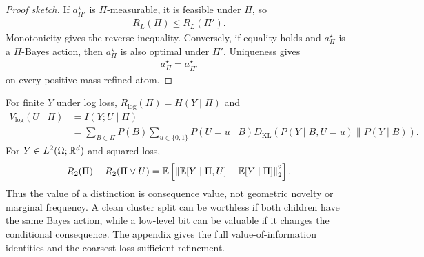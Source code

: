 \begin{proof}[Proof sketch]
If $a_{\Pi'}^\star$ is $\Pi$-measurable, it is feasible under $\Pi$, so
\begin{align*}
R_L(\Pi)\le R_L(\Pi').
\end{align*}
Monotonicity gives the reverse inequality. Conversely, if equality holds and $a_\Pi^\star$ is a $\Pi$-Bayes action, then $a_\Pi^\star$ is also optimal under $\Pi'$. Uniqueness gives
\begin{align*}
a_\Pi^\star=a_{\Pi'}^\star
\end{align*}
on every positive-mass refined atom.
\end{proof}

For finite $Y$ under log loss, $R_{\log}(\Pi)=H(Y\mid\Pi)$ and
\begin{align*}
V_{\log}(U\mid\Pi)
&=
I(Y;U\mid\Pi)\\
&=
\sum_{B\in\Pi}P(B)
\sum_{u\in\{0,1\}}P(U=u\mid B)
D_{\mathrm{KL}}\left(
P(Y\mid B,U=u)
\middle\|
P(Y\mid B)
\right).
\end{align*}
For $Y\in L^2(\Omega;\mathbb{R}^d)$ and squared loss,
\begin{align*}
R_2(\Pi)-R_2(\Pi\vee U)
=
\operatorname*{\mathbb{E}}\left[
\left\|
\operatorname*{\mathbb{E}}[Y\mid \Pi,U]
-
\operatorname*{\mathbb{E}}[Y\mid \Pi]
\right\|_2^2
\right].
\end{align*}
Thus the value of a distinction is consequence value, not geometric novelty or marginal frequency. A clean cluster split can be worthless if both children have the same Bayes action, while a low-level bit can be valuable if it changes the conditional consequence. The appendix gives the full value-of-information identities and the coarsest loss-sufficient refinement.
